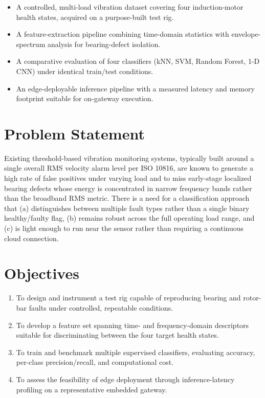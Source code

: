 \documentclass[12pt,a4paper]{report}
\begin{document}
\begin{tcolorbox}[keybox,title={Key Contributions of this Thesis}]
\begin{itemize}
  \item A controlled, multi-load vibration dataset covering four induction-motor health states,
        acquired on a purpose-built test rig.
  \item A feature-extraction pipeline combining time-domain statistics with envelope-spectrum
        analysis for bearing-defect isolation.
  \item A comparative evaluation of four classifiers (kNN, SVM, Random Forest, 1-D CNN) under
        identical train/test conditions.
  \item An edge-deployable inference pipeline with a measured latency and memory footprint
        suitable for on-gateway execution.
\end{itemize}
\end{tcolorbox}

\section{Problem Statement}
Existing threshold-based vibration monitoring systems, typically built around a single overall
RMS velocity alarm level per ISO 10816, are known to generate a high rate of false positives
under varying load and to miss early-stage localized bearing defects whose energy is
concentrated in narrow frequency bands rather than the broadband RMS metric. There is a need for
a classification approach that (a) distinguishes between multiple fault types rather than a
single binary healthy/faulty flag, (b) remains robust across the full operating load range, and
(c) is light enough to run near the sensor rather than requiring a continuous cloud connection.

\section{Objectives}
\begin{enumerate}
  \item To design and instrument a test rig capable of reproducing bearing and rotor-bar faults
        under controlled, repeatable conditions.
  \item To develop a feature set spanning time- and frequency-domain descriptors suitable for
        discriminating between the four target health states.
  \item To train and benchmark multiple supervised classifiers, evaluating accuracy,
        per-class precision/recall, and computational cost.
  \item To assess the feasibility of edge deployment through inference-latency profiling on a
        representative embedded gateway.
\end{enumerate}
\end{document}
